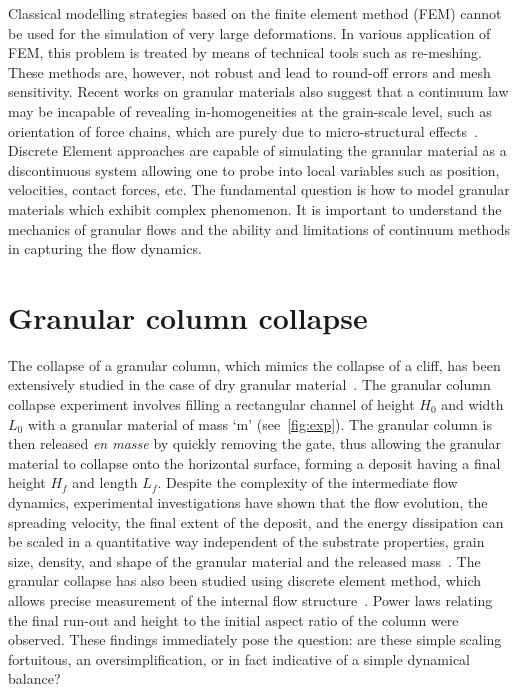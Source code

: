 Classical modelling strategies based on the finite element method (FEM) cannot 
be used for the simulation of very large deformations. In various application 
of FEM, this problem is treated by means of technical tools such as re-meshing. 
These methods are, however, not robust and lead to round-off errors and mesh 
sensitivity. Recent works on granular materials also suggest that a continuum 
law may be incapable of revealing in-homogeneities at the grain-scale level, 
such as orientation of force chains, which are purely due to micro-structural 
effects~\citep{Rycroft2009a}. Discrete Element approaches are capable of 
simulating the granular material as a discontinuous system allowing one to 
probe into local variables such as position, velocities, contact forces, etc. 
The fundamental question is how to model granular materials which exhibit 
complex phenomenon. It is important to understand the mechanics of granular 
flows and the ability and limitations of continuum methods in capturing the 
flow dynamics.

\section{Granular column collapse}

The collapse of a granular column, which mimics the
collapse of a cliff, has been extensively studied in the case of
dry granular 
material~\citep{Lube2005,Lajeunesse2004,Kerswell2005,Zenit2005,Staron2007a,Hogg2007,Lo2009}.
The granular column collapse experiment involves filling a rectangular channel 
of height $H_0$ and width $L_0$ with a granular material of mass 
`m' (see~\cref{fig:exp}). The granular column is then released \textit{en 
masse} by quickly removing the gate, thus allowing the granular material to 
collapse onto the horizontal surface, forming a deposit having a final height 
$H_f$ and length $L_f$. Despite the complexity of the intermediate flow 
dynamics, experimental investigations have shown that the flow evolution, the 
spreading velocity, the final extent of the deposit, and the energy dissipation 
can be scaled in a quantitative way independent of the substrate properties, 
grain size, density, and shape of the granular material and the released 
mass~\citep{Staron2007a,Lajeunesse2005,Lube2005}. The granular collapse has 
also been studied using discrete element method, which allows precise 
measurement of the internal flow 
structure~\citep{Lo2009,Staron2006a,Staron2007a,Utili2014}.
Power laws relating the final run-out and height to the initial aspect ratio of 
the column were observed. These findings immediately pose the question: are 
these simple scaling fortuitous, an oversimplification, or in fact indicative 
of a simple dynamical balance? 


